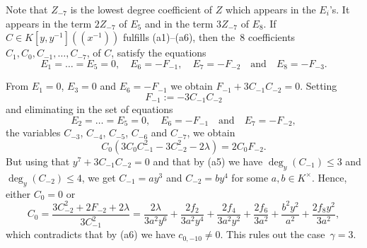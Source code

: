 \documentclass[reqno,a4paper]{amsart}
\theoremstyle{definition}
\theoremstyle{remark}
\begin{document}
Note that $Z_{-7}$ is the lowest degree coefficient of $Z$ which appears in the $E_i$'s.
It appears in the term $2 Z_{-7}$ of $E_5$ and in the term $3 Z_{-7}$ of  $E_{8}$. If
$C\!\in\! K[y,y^{-1}]((x^{-1}))$ fulfills (a1)--(a6), then the~8 coefficients
$C_1,C_0,C_{-1},\dots,C_{-7}$, of $C$, satisfy the equations
\begin{equation*}
E_1=\dots= E_5=0,\quad E_{6} =-F_{-1},\quad E_{7}=-F_{-2}\quad\text{and}\quad E_{8}=-F_{-3}.
\end{equation*}

From $E_1=0$, $E_3=0$ and $E_6=-F_{-1}$ we obtain $F_{-1}+3 C_{-1}C_{-2}=0$. Setting
$$
F_{-1}:=-3 C_{-1}C_{-2}
$$
and eliminating in the set of equations
$$
E_2=\dots=E_5 = 0,\quad E_6 = -F_{-1}\quad\text{and}\quad E_7 = -F_{-2},
$$
the variables $C_{-3}$, $C_{-4}$, $C_{-5}$, $C_{-6}$ and $C_{-7}$, we obtain
$$
C_0 (3 C_0 C_{-1}^2 - 3 C_{-2}^2 - 2 \lambda) = 2 C_0 F_{-2}.
$$
But using that  $y^7+3 C_{-1}C_{-2}=0$ and that by (a5) we have $\deg_y(C_{-1})\le 3$ and
$\deg_y(C_{-2})\le 4$, we get $C_{-1}=a y^3$ and $C_{-2}=b y^4$ for some $a,b\in K^{\times}$.
Hence, either $C_0= 0$ or
$$
C_0=\frac{3 C_{-2}^2 +2 F_{-2}+ 2 \lambda}{3 C_{-1}^2}=\frac{2 \lambda}{3 a^2 y^6} + \frac{2 f_2}{3 a^2 y^4}
+ \frac{2 f_4}{3 a^2 y^2} + \frac{2 f_6}{3 a^2}  + \frac{b^2 y^2}{a^2} + \frac{2 f_8 y^2}{3 a^2},
$$
which contradicts that by (a6) we have $c_{0,-10}\ne 0$. This rules out the case~$\gamma=3$.

\smallskip
\end{document}
